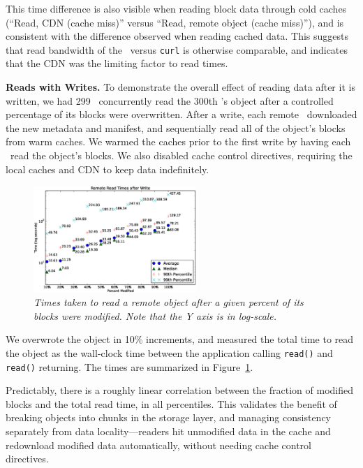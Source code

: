 This time difference is also visible when reading block data through cold caches
(``Read, CDN (cache miss)'' versus ``Read, remote object (cache miss)''), and 
is consistent with the difference observed when reading cached data.
This suggests that read bandwidth of the \SG\ versus {\tt curl} is otherwise
comparable, and indicates that the CDN was the limiting factor to read times.

{\bf Reads with Writes.}  To demonstrate the overall
effect of reading data after it is written, we 
had 299 \SGs\ concurrently read the 300th \SG's object after a controlled
percentage of its blocks were overwritten.  After a write, each remote \SG\ downloaded 
the new metadata and manifest, and sequentially read all of the object's blocks
from warm caches.  We warmed the caches prior to the first write by having each \SG\ 
read the object's blocks.  We also disabled cache control directives, requiring 
the local caches and CDN to keep data indefinitely.


\begin{figure}[h!]
\centerline{\includegraphics[width=0.55\textwidth]{figures/read_after_write}}
\caption{\it Times taken to read a remote object after a given percent of its blocks were modified.  Note that the Y axis is in log-scale.}
\label{fig:read_after_write}
\end{figure}

We overwrote the object in 10\% increments, and measured
the total time to read the object as the wall-clock time between the application 
calling {\tt read()} and {\tt read()} returning.  The times are summarized
in Figure~\ref{fig:read_after_write}.

Predictably, there is a roughly linear correlation between the fraction of modified 
blocks and the total read time, in all percentiles.  This validates the benefit of breaking 
objects into chunks in the storage layer, and managing consistency separately from 
data locality---readers hit unmodified data in the cache and redownload modified data
automatically, without needing cache control directives.


